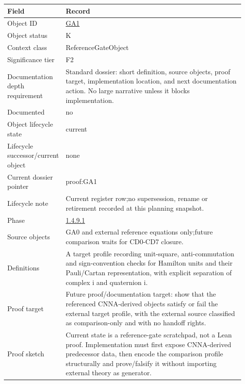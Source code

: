 \begin{longtable}{L{0.16\linewidth} L{0.81\linewidth}}
\hline
\textbf{Field} & \textbf{Record}\\
\hline
Object ID & \hyperlink{object-row-GA1}{GA1}\\
\hline\addlinespace[0.20em]
Object status & K\\
\hline\addlinespace[0.20em]
Context class & ReferenceGateObject\\
\hline\addlinespace[0.20em]
Significance tier & F2\\
\hline\addlinespace[0.20em]
Documentation depth requirement & Standard dossier: short definition, source objects, proof target, implementation location, and next documentation action. No large narrative unless it blocks implementation.\\
\hline\addlinespace[0.20em]
Documented & no\\
\hline\addlinespace[0.20em]
Object lifecycle state & current\\
\hline\addlinespace[0.20em]
Lifecycle successor/\allowbreak{}current object & none\\
\hline\addlinespace[0.20em]
Current dossier pointer & proof:GA1\\
\hline\addlinespace[0.20em]
Lifecycle note & Current register row;\newline no supersession, rename or retirement recorded at this planning snapshot.\\
\hline\addlinespace[0.20em]
Phase & \hyperlink{phase-row-1-4-9-1}{1.4.9.1}\\
\hline\addlinespace[0.20em]
Source objects & GA0 and external reference equations only;\newline future comparison waits for CD0-CD7 closure.\\
\hline\addlinespace[0.20em]
Definitions & A target profile recording unit-square, anti-commutation and sign-convention checks for Hamilton units and their Pauli/\allowbreak{}Cartan representation, with explicit separation of complex i and quaternion i.\\
\hline\addlinespace[0.20em]
Proof target & Future proof/\allowbreak{}documentation target: show that the referenced CNNA-derived objects satisfy or fail the external target profile, with the external source classified as comparison-only and with no handoff rights.\\
\hline\addlinespace[0.20em]
Proof sketch & Current state is a reference-gate scratchpad, not a Lean proof. Implementation must first expose CNNA-derived predecessor data, then encode the comparison profile structurally and prove/\allowbreak{}falsify it without importing external theory as generator.\\

\end{longtable}
